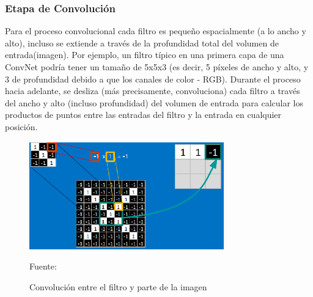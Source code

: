 		\subsubsection {Etapa de Convolución} 
		  
		Para el proceso convolucional cada filtro es pequeño espacialmente (a lo ancho y alto), incluso se extiende a través de la profundidad total del volumen de entrada(imagen). Por ejemplo, un filtro típico en una primera capa de una ConvNet podría tener un tamaño de 5x5x3 (es decir, 5 píxeles de ancho y alto, y 3 de profundidad debido a que los canales de color - RGB). Durante el proceso hacia adelante, se desliza (más precisamente, convoluciona) cada filtro a través del ancho y alto (incluso profundidad) del volumen de entrada para calcular los productos de puntos entre las entradas del filtro y la entrada en cualquier posición.

		\begin{figure}[H]
		\begin{center}
		\includegraphics[width=0.75\textwidth]{images/marcoteorico/generate_filt1}
		\end{center}
		\begin{center}
		\caption{\small{Convolución entre el filtro y parte de la imagen}}
		\vskip -0.25cm
		{\small{Fuente: \cite{Rohrer}}}
		\end{center}
		\vspace{-1.9em}
		\end{figure}

